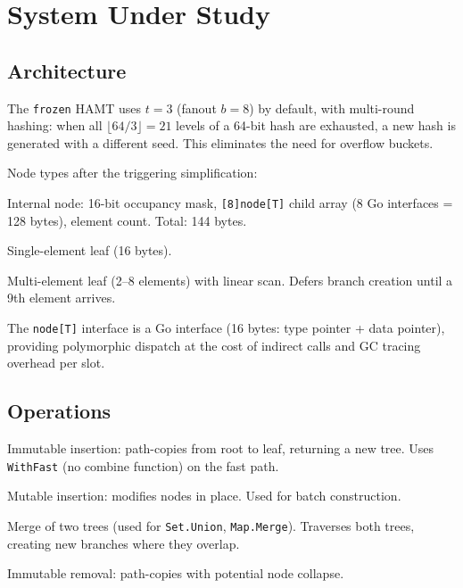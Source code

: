 \documentclass[11pt,twocolumn]{article}
\begin{document}
\section{System Under Study}
\label{sec:system}

\subsection{Architecture}

The \texttt{frozen} HAMT uses $t = 3$ (fanout $b = 8$) by default, with
multi-round hashing: when all $\lfloor 64/3 \rfloor = 21$ levels of a
64-bit hash are exhausted, a new hash is generated with a different seed.
This eliminates the need for overflow buckets.

Node types after the triggering simplification:

\begin{description}[nosep,leftmargin=1em]
  \item[\texttt{branch[T]}] Internal node: 16-bit occupancy mask,
    \texttt{[8]node[T]} child array (8 Go interfaces = 128 bytes), element
    count. Total: 144 bytes.
  \item[\texttt{leaf1[T]}] Single-element leaf (16 bytes).
  \item[\texttt{leaf[T]}] Multi-element leaf (2--8 elements) with linear scan.
    Defers branch creation until a 9th element arrives.
\end{description}

The \texttt{node[T]} interface is a Go interface (16 bytes: type pointer +
data pointer), providing polymorphic dispatch at the cost of indirect calls
and GC tracing overhead per slot.

\subsection{Operations}

\begin{description}[nosep,leftmargin=1em]
  \item[\texttt{With}] Immutable insertion: path-copies from root to leaf,
    returning a new tree. Uses \texttt{WithFast} (no combine function) on
    the fast path.
  \item[\texttt{Builder.Add}] Mutable insertion: modifies nodes in place.
    Used for batch construction.
  \item[\texttt{Combine}] Merge of two trees (used for \texttt{Set.Union},
    \texttt{Map.Merge}). Traverses both trees, creating new branches where
    they overlap.
  \item[\texttt{Without}] Immutable removal: path-copies with potential
    node collapse.
\end{description}
\end{document}
